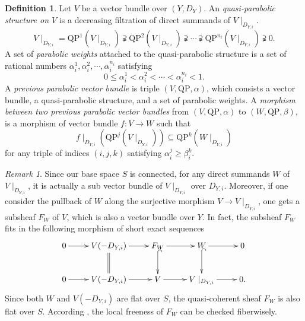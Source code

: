 \documentclass[12pt,twoside]{book}
\theoremstyle{plain}
\theoremstyle{definition}
\newtheorem{definition}[definition]{Definition}
\theoremstyle{remark}
\newtheorem{remark}[remark]{Remark}
\numberwithin{equation}{section}
\def\QP{{\mathrm{QP}}}
\begin{document}
\begin{definition}
Let $V$ be a vector bundle over $(Y,D_Y)$. An \emph{quasi-parabolic structure on $V$} is a decreasing filtration of direct summands of $V\mid_{D_{Y,i}}$.
\[V\mid_{D_{Y,i}} = \QP^1(V\mid_{D_{Y,i}}) \supsetneqq \QP^2(V\mid_{D_{Y,i}}) \supsetneqq \cdots \supsetneqq \QP^{n_i}(V\mid_{D_{Y,i}}) \supsetneqq 0.\]
A set of \emph{parabolic weights} attached to the quasi-parabolic structure is a set of rational numbers $\alpha_i^1,\alpha_i^2,\cdots,\alpha_i^{n_i}$ satisfying
\[0\leq\alpha_i^1<\alpha_i^2<\cdots<\alpha_i^{n_i}<1.\]
A \emph{previous parabolic vector bundle} is triple $(V,\QP,\alpha)$, which consists a vector bundle, a quasi-parabolic structure, and a set of parabolic weights. A \emph{morphism between two previous parabolic vector bundles} from $(V,\QP,\alpha)$ to $(W,\QP,\beta)$, is a morphism of vector bundle $f\colon V\rightarrow W$ such that
\[f\mid_{D_{Y,i}} (\QP^j(V\mid_{D_{Y,i}})) \subseteq \QP^k(W\mid_{D_{Y,i}})\]
for any triple of indices $(i,j,k)$ satisfying $\alpha_i^j\geq \beta_i^k$.
\end{definition}

\begin{remark} \label{rmk:freeness}Since our base space $S$ is connected, for any direct summands $W$ of $V\mid_{D_{Y,i}}$, it is actually a sub vector bundle of $V\mid_{D_{Y,i}}$ over $D_{Y,i}$. Moreover, if one consider the pullback of $W$ along the surjective morphism $V\rightarrow V\mid_{D_{Y,i}}$, one gets a subsheaf $F_W$ of $V$, which is also a vector bundle over $Y$. In fact, the subsheaf $F_W$ fits in the following morphism of short exact sequences
\begin{equation*}\xymatrix{
0 \ar[r] & V(-D_{Y,i}) \ar@{=}[d] \ar[r] & F_W \ar@{^(->}[d] \ar[r] & W \ar[r] \ar@{^(->}[d] & 0\\
0 \ar[r] & V(-D_{Y,i}) \ar[r] & V \ar[r] & V\mid_{D_{Y,i}} \ar[r] & 0.\\
}\end{equation*}
Since both $W$ and $V(-D_{Y,i})$ are flat over $S$, the quasi-coherent sheaf $F_W$ is also flat over $S$. According \cite[\href{https://stacks.math.columbia.edu/tag/080Q}{Tag 080Q}]{stacks-project}, the local freeness of $F_W$ can be checked fiberwisely.
\end{remark}
\end{document}
